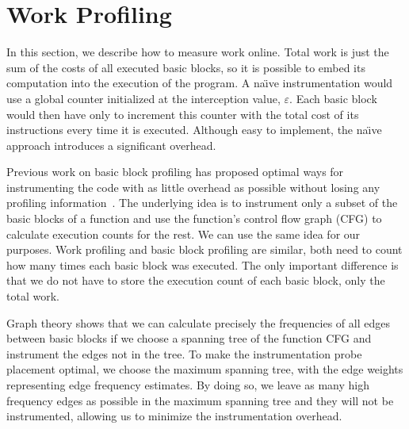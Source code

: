 \section{Work Profiling}

In this section, we describe how to measure work online. Total work is just the sum of the costs of all executed basic blocks, so it is
possible to embed its computation into the execution of the program. A na\"{\i}ve instrumentation would use a global counter initialized at
the interception value, $\varepsilon$. Each basic block would then have only to increment this counter with the total cost of its
instructions every time it is executed. Although easy to implement, the na\"{\i}ve approach introduces a significant overhead.

Previous work on basic block profiling has proposed optimal ways for instrumenting the code with as little overhead as possible without
losing any profiling information~\citep{knuth73,ball94}. The underlying idea is to instrument only a subset of the basic blocks of a
function and use the function's control flow graph (CFG) to calculate execution counts for the rest. We can use the same idea for our
purposes. Work profiling and basic block profiling are similar, both need to count how many times each basic block was executed. The only
important difference is that we do not have to store the execution count of each basic block, only the total work.

Graph theory shows that we can calculate precisely the frequencies of all edges between basic blocks if we choose a spanning tree of the
function CFG and instrument the edges not in the tree. To make the instrumentation probe placement optimal, we choose the maximum spanning
tree, with the edge weights representing edge frequency estimates. By doing so, we leave as many high frequency edges as possible in the
maximum spanning tree and they will not be instrumented, allowing us to minimize the instrumentation overhead.

